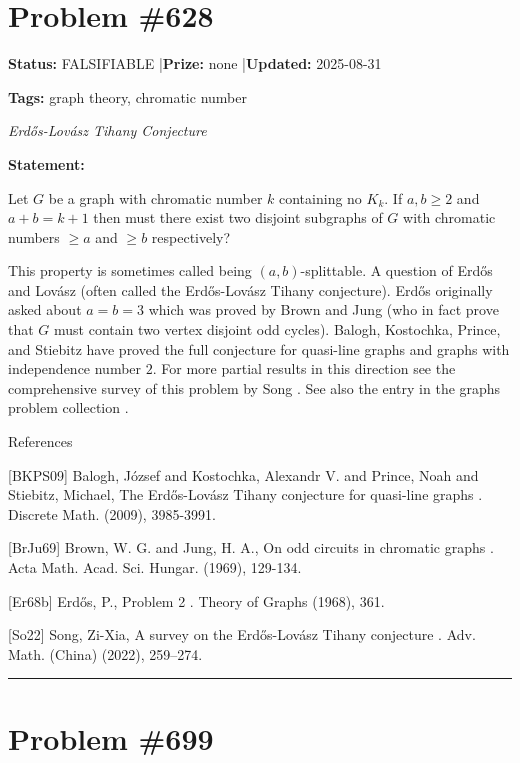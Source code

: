\documentclass{article}
\begin{document}
\section{Problem \#628}
\label{prob:628}

\noindent\textbf{Status:} FALSIFIABLE \quad|\quad \textbf{Prize:} none \quad|\quad \textbf{Updated:} 2025-08-31

\noindent\textbf{Tags:} graph theory, chromatic number

\medskip
\noindent\textit{Erdős-Lovász Tihany Conjecture}


\noindent\textbf{Statement:}

Let $G$ be a graph with chromatic number $k$ containing no $K_k$. If $a,b\geq 2$ and $a+b=k+1$ then must there exist two disjoint subgraphs of $G$ with chromatic numbers $\geq a$ and $\geq b$ respectively?




This property is sometimes called being $(a,b)$-splittable. A question of Erd\H{o}s and Lov\'{a}sz (often called the Erd\H{o}s-Lov\'{a}sz Tihany conjecture). Erd\H{o}s \cite{Er68b} originally asked about $a=b=3$ which was proved by Brown and Jung \cite{BrJu69} (who in fact prove that $G$ must contain two vertex disjoint odd cycles). Balogh, Kostochka, Prince, and Stiebitz \cite{BKPS09} have proved the full conjecture for quasi-line graphs and graphs with independence number $2$. For more partial results in this direction see the comprehensive survey of this problem by Song \cite{So22}. See also the entry in the graphs problem collection .




References

[BKPS09] Balogh, J\'{o}zsef and Kostochka, Alexandr V. and Prince, Noah and Stiebitz, Michael, The Erd\H{o}s-Lov\'{a}sz Tihany conjecture for quasi-line graphs . Discrete Math. (2009), 3985-3991.

[BrJu69] Brown, W. G. and Jung, H. A., On odd circuits in chromatic graphs . Acta Math. Acad. Sci. Hungar. (1969), 129-134.

[Er68b] Erd\H{o}s, P., Problem 2 . Theory of Graphs (1968), 361.

[So22] Song, Zi-Xia, A survey on the {E}rd\H{o}s-{L}ov\'{a}sz Tihany conjecture . Adv. Math. (China) (2022), 259--274.

\noindent\rule{\linewidth}{0.4pt}


\section{Problem \#699}
\label{prob:699}
\end{document}
